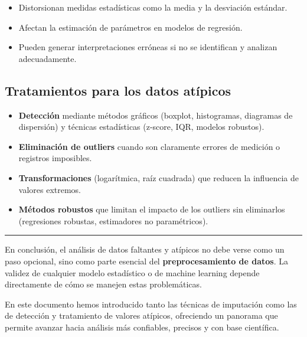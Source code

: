 \documentclass[
]{book}
\providecommand{\tightlist}{%
  \setlength{\itemsep}{0pt}\setlength{\parskip}{0pt}}
\begin{document}
\begin{itemize}
\tightlist
\item
  Distorsionan medidas estadísticas como la media y la desviación estándar.\\
\item
  Afectan la estimación de parámetros en modelos de regresión.\\
\item
  Pueden generar interpretaciones erróneas si no se identifican y analizan adecuadamente.
\end{itemize}

\subsection{Tratamientos para los datos atípicos}\label{tratamientos-para-los-datos-atuxedpicos}

\begin{itemize}
\tightlist
\item
  \textbf{Detección} mediante métodos gráficos (boxplot, histogramas, diagramas de dispersión) y técnicas estadísticas (z-score, IQR, modelos robustos).\\
\item
  \textbf{Eliminación de outliers} cuando son claramente errores de medición o registros imposibles.\\
\item
  \textbf{Transformaciones} (logarítmica, raíz cuadrada) que reducen la influencia de valores extremos.\\
\item
  \textbf{Métodos robustos} que limitan el impacto de los outliers sin eliminarlos (regresiones robustas, estimadores no paramétricos).
\end{itemize}

\begin{center}\rule{0.5\linewidth}{0.5pt}\end{center}

En conclusión, el análisis de datos faltantes y atípicos no debe verse como un paso opcional, sino como parte esencial del \textbf{preprocesamiento de datos}. La validez de cualquier modelo estadístico o de machine learning depende directamente de cómo se manejen estas problemáticas.

En este documento hemos introducido tanto las técnicas de imputación como las de detección y tratamiento de valores atípicos, ofreciendo un panorama que permite avanzar hacia análisis más confiables, precisos y con base científica.
\end{document}
